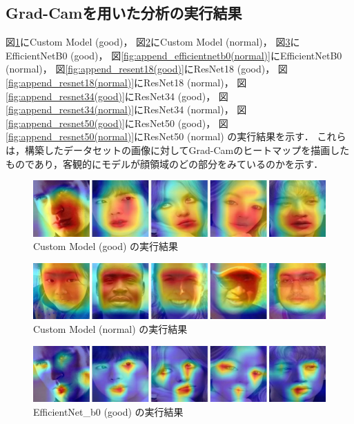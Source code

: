\documentclass[a4paper,11pt,titlepage]{jsarticle}
\begin{document}
\subsection{Grad-Camを用いた分析の実行結果}

図\ref{fig:append_custom(good)}にCustom Model (good)，
図\ref{fig:append_custom(normal)}にCustom Model (normal)，
図\ref{fig:append_efficientnetb0(good)}にEfficientNetB0 (good)，
図\ref{fig:append_efficientnetb0(normal)}にEfficientNetB0 (normal)，
図\ref{fig:append_resent18(good)}にResNet18 (good)，
図\ref{fig:append_resnet18(normal)}にResNet18 (normal)，
図\ref{fig:append_resnet34(good)}にResNet34 (good)，
図\ref{fig:append_resnet34(normal)}にResNet34 (normal)，
図\ref{fig:append_resnet50(good)}にResNet50 (good)，
図\ref{fig:append_resnet50(normal)}にResNet50 (normal) の実行結果を示す．
これらは，構築したデータセットの画像に対してGrad-Camのヒートマップを描画したものであり，客観的にモデルが顔領域のどの部分をみているのかを示す．

\begin{figure}[H]
    \centering
    \includegraphics[width=1.1\textwidth]{custom(good).jpg}
    \caption{Custom Model (good) の実行結果}
    \label{fig:append_custom(good)}
\end{figure}

\begin{figure}[H]
    \centering
    \includegraphics[width=1.1\textwidth]{custom(normal).jpg}
    \caption{Custom Model (normal) の実行結果}
    \label{fig:append_custom(normal)}
\end{figure}

\begin{figure}[H]
    \centering
    \includegraphics[width=1.1\textwidth]{efficientnetb0(good).jpg}
    \caption{EfficientNet\_b0 (good) の実行結果}
    \label{fig:append_efficientnetb0(good)}
\end{figure}
\end{document}
